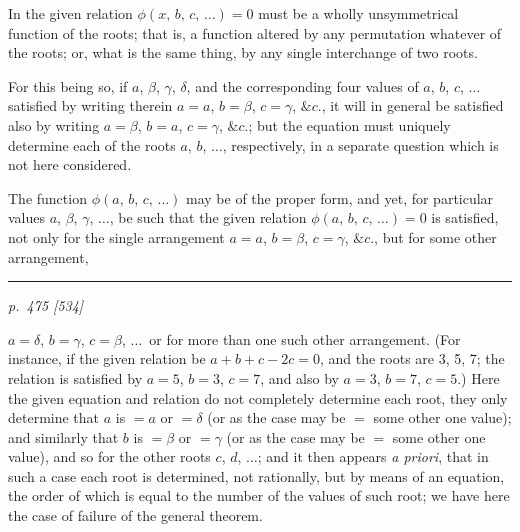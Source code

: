 \documentclass[11pt,a4paper]{book}
\begin{document}
In the given relation $\phi(x,\,b,\,c,\,\ldots) = 0$ must be a wholly unsymmetrical function of
the roots; that is, a function altered by any permutation whatever of the roots; or,
what is the same thing, by any single interchange of two roots.

For this being so, if $a$, $\beta$, $\gamma$, $\delta$, and the corresponding four values of $a$, $b$, $c$, $\ldots$ satisfied
by writing therein $a = a$, $b = \beta$, $c = \gamma$, $\&c.$, it will in general be satisfied also by
writing $a = \beta$, $b = a$, $c = \gamma$, $\&c.$; but the equation must uniquely determine each of the
roots $a$, $b$, $\ldots$, respectively, in a separate question which is not here considered.

The function $\phi(a,\,b,\,c,\,\ldots)$ may be of the proper form, and yet, for particular
values $a$, $\beta$, $\gamma$, $\ldots$, be such that the given relation $\phi(a,\,b,\,c,\,\ldots) = 0$ is satisfied, not only
for the single arrangement $a = a$, $b = \beta$, $c = \gamma$, $\&c.$, but for some other arrangement,

\smallskip
\noindent\rule{0.45\textwidth}{0.4pt}

\clearpage

\bigskip
\textit{p.~475 [534]}
\smallskip

\noindent
$a = \delta$, $b = \gamma$, $c = \beta$, $\ldots$\ or for more than one such other arrangement. (For instance, if
the given relation be $a + b + c - 2c = 0$, and the roots are 3, 5, 7; the relation is
satisfied by $a=5$, $b=3$, $c=7$, and also by $a=3$, $b=7$, $c=5$.) Here the given equation
and relation do not completely determine each root, they only determine that $a$ is $= a$
or $= \delta$ (or as the case may be $=$ some other one value); and similarly that $b$ is $= \beta$
or $= \gamma$ (or as the case may be $=$ some other one value), and so for the other roots
$c$, $d$, $\ldots$; and it then appears \textit{a priori}, that in such a case each root is determined,
not rationally, but by means of an equation, the order of which is equal to the
number of the values of such root; we have here the case of failure of the general
theorem.
\end{document}
